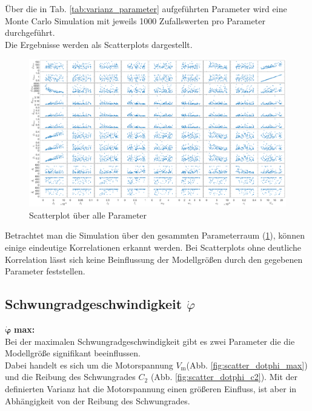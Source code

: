 Über die in Tab. \ref{tab:varianz_parameter} aufgeführten Parameter wird eine Monte Carlo Simulation mit jeweils 1000 Zufallswerten pro Parameter durchgeführt.\\
Die Ergebnisse werden als Scatterplots dargestellt.\\

\begin{figure}
    \centering
    \includegraphics[width=\textwidth]{Bilder/5_sensi/cm/scatter.eps}
    \caption{Scatterplot über alle Parameter}
    \label{fig:scatter}
\end{figure}
Betrachtet man die Simulation über den gesammten Parameterraum (\ref{fig:scatter}), können einige eindeutige Korrelationen erkannt werden.
Bei Scatterplots ohne deutliche Korrelation lässt sich keine Beinflussung der Modellgrößen durch den gegebenen Parameter feststellen.

\subsection*{Schwungradgeschwindigkeit $\dot\varphi$}
$\bm{\dot\varphi}$ \textbf{max: }\\
Bei der maximalen Schwungradgeschwindigkeit gibt es zwei Parameter die die Modellgröße signifikant beeinflussen.\\
Dabei handelt es sich um die Motorspannung $V_{\mathrm{m}}$(Abb. \ref{fig:scatter_dotphi_max}) und die Reibung des Schwungrades $C_2$ (Abb. \ref{fig:scatter_dotphi_c2}).
Mit der definierten Varianz hat die Motorspannung einen größeren Einfluss, ist aber in Abhängigkeit von der Reibung des Schwungrades.\\

